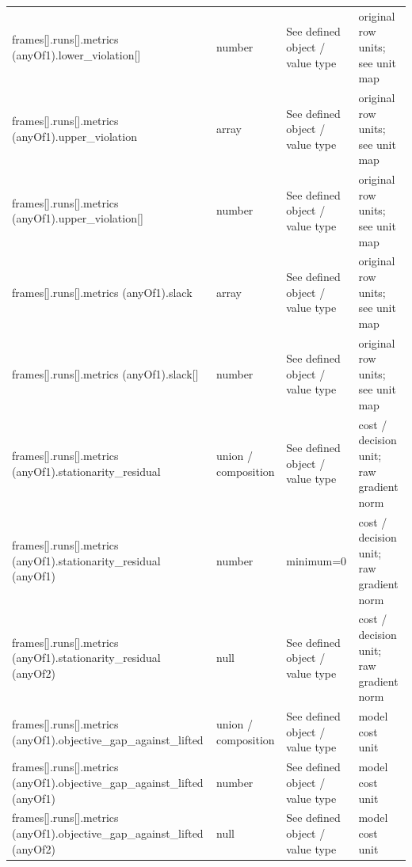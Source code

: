 \begin{longtable}{@{}>{\raggedright\arraybackslash}p{}>{\raggedright\arraybackslash}p{}>{\raggedright\arraybackslash}p{}>{\raggedright\arraybackslash}p{}@{}}
frames[].\allowbreak{}runs[].\allowbreak{}metrics (anyOf1).\allowbreak{}lower\_\allowbreak{}violation[] & number & See defined object /\allowbreak{} value type & original row units; see unit map\\
frames[].\allowbreak{}runs[].\allowbreak{}metrics (anyOf1).\allowbreak{}upper\_\allowbreak{}violation & array & See defined object /\allowbreak{} value type & original row units; see unit map\\
frames[].\allowbreak{}runs[].\allowbreak{}metrics (anyOf1).\allowbreak{}upper\_\allowbreak{}violation[] & number & See defined object /\allowbreak{} value type & original row units; see unit map\\
frames[].\allowbreak{}runs[].\allowbreak{}metrics (anyOf1).\allowbreak{}slack & array & See defined object /\allowbreak{} value type & original row units; see unit map\\
frames[].\allowbreak{}runs[].\allowbreak{}metrics (anyOf1).\allowbreak{}slack[] & number & See defined object /\allowbreak{} value type & original row units; see unit map\\
frames[].\allowbreak{}runs[].\allowbreak{}metrics (anyOf1).\allowbreak{}stationarity\_\allowbreak{}residual & union /\allowbreak{} composition & See defined object /\allowbreak{} value type & cost /\allowbreak{} decision unit; raw gradient norm\\
frames[].\allowbreak{}runs[].\allowbreak{}metrics (anyOf1).\allowbreak{}stationarity\_\allowbreak{}residual (anyOf1) & number & minimum=\allowbreak{}0 & cost /\allowbreak{} decision unit; raw gradient norm\\
frames[].\allowbreak{}runs[].\allowbreak{}metrics (anyOf1).\allowbreak{}stationarity\_\allowbreak{}residual (anyOf2) & null & See defined object /\allowbreak{} value type & cost /\allowbreak{} decision unit; raw gradient norm\\
frames[].\allowbreak{}runs[].\allowbreak{}metrics (anyOf1).\allowbreak{}objective\_\allowbreak{}gap\_\allowbreak{}against\_\allowbreak{}lifted & union /\allowbreak{} composition & See defined object /\allowbreak{} value type & model cost unit\\
frames[].\allowbreak{}runs[].\allowbreak{}metrics (anyOf1).\allowbreak{}objective\_\allowbreak{}gap\_\allowbreak{}against\_\allowbreak{}lifted (anyOf1) & number & See defined object /\allowbreak{} value type & model cost unit\\
frames[].\allowbreak{}runs[].\allowbreak{}metrics (anyOf1).\allowbreak{}objective\_\allowbreak{}gap\_\allowbreak{}against\_\allowbreak{}lifted (anyOf2) & null & See defined object /\allowbreak{} value type & model cost unit\\

\end{longtable}
